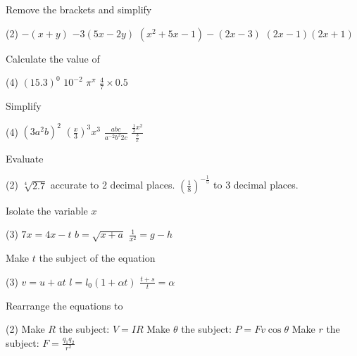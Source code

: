 \begin{Exercise}[title={Algebra Review},label=ex11]
\Question Remove the brackets and simplify
\begin{tasks}(2)
	\task 	 $ -\left (x +y\right )$ %
	\task    $ -3 (5 x -2 y)$	%
	\task 	$\left (x^{2} +5 x -1\right ) -\left (2 x -3\right )$%
	\task    $\left (2 x -1\right ) \left (2 x +1\right )$%
\end{tasks}

\Question Calculate the value of
\begin{tasks}(4)
	\task 	 $\left (15.3\right )^{0}$
	\task    $10^{ -2}$
	\task	$\pi^\pi$%
	\task	$\frac{4}{7}\times 0.5$%
\end{tasks}
 
\Question Simplify
\begin{tasks}(4)
	\task 	 $\left (3 a^{2} b\right )^{2}$%
	\task    $\left(\frac{x}{3}\right)^{3} x^{3}$%
	\task	$\displaystyle \frac{abc}{a^{-2}b^2 2c}$%
	\task	$\displaystyle \frac{\frac{1}{2}x^2}{\frac{3}{x}}$%
\end{tasks}

\Question Evaluate
\begin{tasks}(2)
	\task 	 $\sqrt[{4}]{2.7}$ accurate to 2 decimal places. %
	\task    $ \left(\frac{1}{8}\right)^{-\frac{1}{5}}$ to 3 decimal places.%
\end{tasks}

\Question Isolate the variable $x$
\begin{tasks}(3)
	\task 	 $7x=4x-t$%
	\task $b=\sqrt{x+a}$%
	\task   $\displaystyle \frac{1}{x^2}=g-h$%
\end{tasks}

\Question Make $t$ the subject of the equation
\begin{tasks}(3)
	\task 	 $v =u +a t$%
	\task    $l =l_{0} \left (1 +\alpha  t\right )$%
	\task    $\displaystyle\frac{t+s}{t}=\alpha$ %
\end{tasks}

\Question Rearrange the equations to
\begin{tasks}(2)
	\task 	 Make $R$ the subject: $V=IR$%
	\task 	 Make $\theta$ the subject: $P=Fv\cos\theta$%
	\task 	 Make $r$ the subject: $F=\frac{q_1 q_2}{r^2}$%
\end{tasks}


\end{Exercise}
